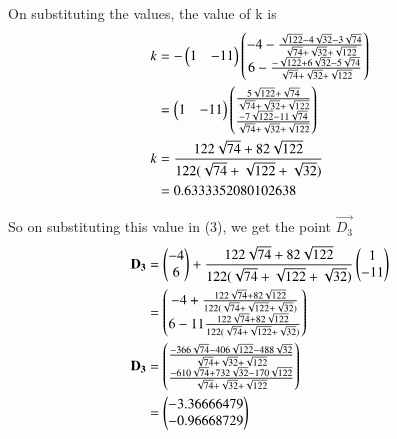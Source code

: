 \documentclass[journal,12pt,twocolumn]{IEEEtran}
\theoremstyle{remark}
\begin{document}
On substituting the values, the value of k is 
\begin{align}
k&=-\begin{pmatrix}1&-11\end{pmatrix}\begin{pmatrix}-4-\frac{\sqrt{122}-4\sqrt{32}-3\sqrt{74}}{\sqrt{74}+\sqrt{32}+\sqrt{122}}\\6-\frac{-\sqrt{122}+6\sqrt{32}-5\sqrt{74}}{\sqrt{74}+\sqrt{32}+\sqrt{122}}\end{pmatrix}\nonumber\\
&=\begin{pmatrix}1&-11\end{pmatrix}\begin{pmatrix}\frac{5\sqrt{122}+\sqrt{74}}{\sqrt{74}+\sqrt{32}+\sqrt{122}}\\\frac{-7\sqrt{122}-11\sqrt{74}}{\sqrt{74}+\sqrt{32}+\sqrt{122}}\end{pmatrix}\nonumber\\
k&=\frac{122\sqrt{74}+82\sqrt{122}}{122(\sqrt{74}+\sqrt{122}+\sqrt{32})}\\
&=0.6333352080102638\nonumber
\end{align}

So on substituting this value in (3), we get the point $\vec{D_{3}}$ 
\begin{align}
\mathbf{D_{3}} &=\begin{pmatrix}-4\\6\end{pmatrix} + \frac{122\sqrt{74}+82\sqrt{122}}{122(\sqrt{74}+\sqrt{122}+\sqrt{32})}\begin{pmatrix}1\\-11\end{pmatrix}\nonumber\\
&=\begin{pmatrix}-4+\frac{122\sqrt{74}+82\sqrt{122}}{122(\sqrt{74}+\sqrt{122}+\sqrt{32})}\\6-11\frac{122\sqrt{74}+82\sqrt{122}}{122(\sqrt{74}+\sqrt{122}+\sqrt{32})}\end{pmatrix}\nonumber\\
\mathbf{D_{3}} &=\begin{pmatrix}{\frac{-366\sqrt{74}-406\sqrt{122}-488\sqrt{32}}{\sqrt{74}+\sqrt{32}+\sqrt{122}}}\\{\frac{-610\sqrt{74}+732\sqrt{32}-170\sqrt{122}}{\sqrt{74}+\sqrt{32}+\sqrt{122}}}\end{pmatrix}\\
&=\begin{pmatrix}-3.36666479\\-0.96668729\end{pmatrix}\nonumber
\end{align}
\end{document}
